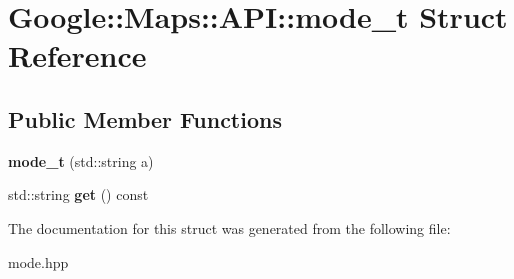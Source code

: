 \hypertarget{structGoogle_1_1Maps_1_1API_1_1mode__t}{}\section{Google\+:\+:Maps\+:\+:A\+PI\+:\+:mode\+\_\+t Struct Reference}
\label{structGoogle_1_1Maps_1_1API_1_1mode__t}
\subsection*{Public Member Functions}
\begin{DoxyCompactItemize}
\item 
\mbox{\label{structGoogle_1_1Maps_1_1API_1_1mode__t_a9cbdbd6096f389a15acdbefa19490235}} 
{\bfseries mode\+\_\+t} (std\+::string a)
\item 
\mbox{\label{structGoogle_1_1Maps_1_1API_1_1mode__t_a84b8a1aa0c105d5d6a530777dcd9d4b4}} 
std\+::string {\bfseries get} () const
\end{DoxyCompactItemize}


The documentation for this struct was generated from the following file\+:\begin{DoxyCompactItemize}
\item 
mode.\+hpp\end{DoxyCompactItemize}

